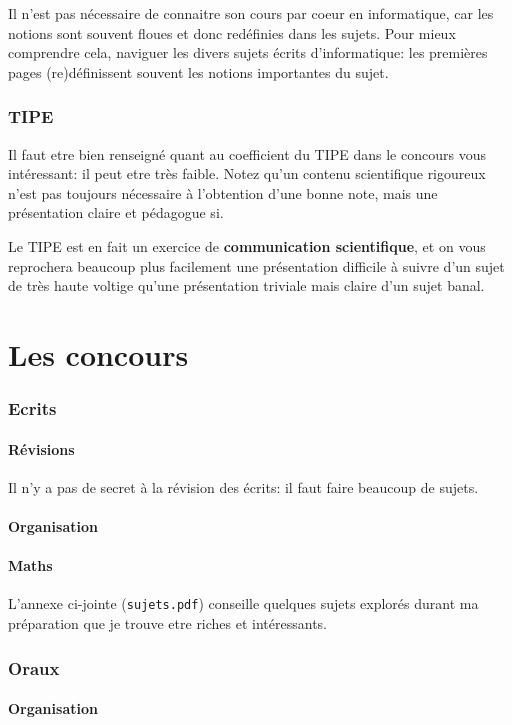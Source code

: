\documentclass{article}
\begin{document}
Il n'est pas nécessaire de connaitre son cours par coeur en informatique, car les notions sont souvent floues et donc redéfinies dans les sujets.
Pour mieux comprendre cela, naviguer les divers sujets écrits d'informatique: les premières pages (re)définissent souvent les notions importantes du sujet.

\section{TIPE}
Il faut etre bien renseigné quant au coefficient du TIPE dans le concours vous intéressant: il peut etre très faible.
Notez qu'un contenu scientifique rigoureux n'est pas toujours nécessaire à l'obtention d'une bonne note, mais une présentation claire et pédagogue si.

Le TIPE est en fait un exercice de \textbf{communication scientifique}, et on vous reprochera beaucoup plus facilement une présentation difficile à suivre d'un sujet de très haute voltige qu'une présentation triviale mais claire d'un sujet banal.

\part{Les concours}
\section{Ecrits}

\subsection{Révisions}
Il n'y a pas de secret à la révision des écrits: il faut faire beaucoup de sujets.

\subsection{Organisation}
\subsection{Maths}
L'annexe ci-jointe (\texttt{sujets.pdf}) conseille quelques sujets explorés durant ma préparation que je trouve etre riches et intéressants.

\section{Oraux}
\subsection{Organisation}
\end{document}
